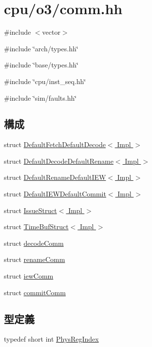 \hypertarget{o3_2comm_8hh}{
\section{cpu/o3/comm.hh}
\label{o3_2comm_8hh}
}
{\ttfamily \#include $<$vector$>$}\par
{\ttfamily \#include \char`\"{}arch/types.hh\char`\"{}}\par
{\ttfamily \#include \char`\"{}base/types.hh\char`\"{}}\par
{\ttfamily \#include \char`\"{}cpu/inst\_\-seq.hh\char`\"{}}\par
{\ttfamily \#include \char`\"{}sim/faults.hh\char`\"{}}\par
\subsection*{構成}
\begin{DoxyCompactItemize}
\item 
struct \hyperlink{structDefaultFetchDefaultDecode}{DefaultFetchDefaultDecode$<$ Impl $>$}
\item 
struct \hyperlink{structDefaultDecodeDefaultRename}{DefaultDecodeDefaultRename$<$ Impl $>$}
\item 
struct \hyperlink{structDefaultRenameDefaultIEW}{DefaultRenameDefaultIEW$<$ Impl $>$}
\item 
struct \hyperlink{structDefaultIEWDefaultCommit}{DefaultIEWDefaultCommit$<$ Impl $>$}
\item 
struct \hyperlink{structIssueStruct}{IssueStruct$<$ Impl $>$}
\item 
struct \hyperlink{structTimeBufStruct}{TimeBufStruct$<$ Impl $>$}
\item 
struct \hyperlink{structTimeBufStruct_1_1decodeComm}{decodeComm}
\item 
struct \hyperlink{structTimeBufStruct_1_1renameComm}{renameComm}
\item 
struct \hyperlink{structTimeBufStruct_1_1iewComm}{iewComm}
\item 
struct \hyperlink{structTimeBufStruct_1_1commitComm}{commitComm}
\end{DoxyCompactItemize}
\subsection*{型定義}
\begin{DoxyCompactItemize}
\item 
typedef short int \hyperlink{o3_2comm_8hh_a5ec29599c4bc29a3054c451674969e7b}{PhysRegIndex}
\end{DoxyCompactItemize}


